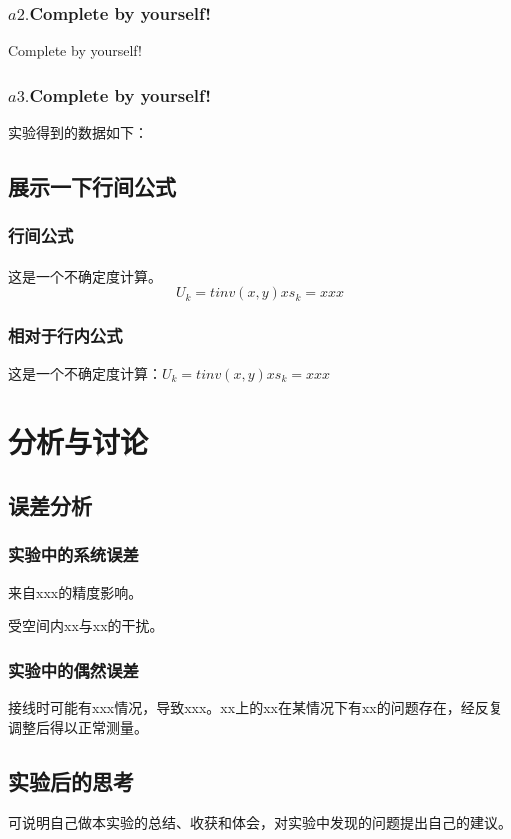 \documentclass[UTF8]{ctexart}
\begin{document}
\subsubsection{$a2. $Complete by yourself!}
Complete by yourself!
\subsubsection{$a3. $Complete by yourself!}
实验得到的数据如下：

\subsection{展示一下行间公式}
\subsubsection{行间公式}
\paragraph{}这是一个不确定度计算。
\[
U_k=tinv(x,y)xs_k=xxx
\]
\subsubsection{相对于行内公式}
这是一个不确定度计算：$U_k=tinv(x,y)xs_k=xxx$


\section{分析与讨论}

\subsection{误差分析}

\subsubsection{实验中的系统误差}
来自xxx的精度影响。

受空间内xx与xx的干扰。

\subsubsection{实验中的偶然误差}
接线时可能有xxx情况，导致xxx。xx上的xx在某情况下有xx的问题存在，经反复调整后得以正常测量。

\subsection{实验后的思考}
可说明自己做本实验的总结、收获和体会，对实验中发现的问题提出自己的建议。
\end{document}

